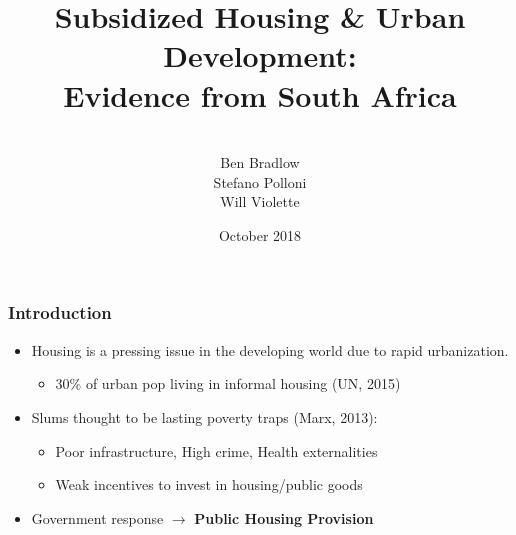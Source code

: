 \documentclass[aspectratio=32]{beamer}
\title{Subsidized Housing \& Urban Development: \\ Evidence from South Africa } %
\author{\\Ben Bradlow \\ Stefano Polloni\\ Will Violette}
\date{October 2018} %
\begin{document}
\beamertemplatenavigationsymbolsempty

\begin{frame}
\titlepage %
\end{frame}



\begin{frame}
\frametitle{Introduction}
\centering

\begin{itemize}
  \item<1-> Housing is a pressing issue in the developing world due to rapid urbanization. 
  \begin{itemize}
  \item 30\% of urban pop living in informal housing (UN, 2015)
  \end{itemize}
  \vspace{2mm}
  \item<2-> Slums thought to be lasting poverty traps (Marx, 2013): 
    \begin{itemize}
      \vspace{1mm}
      \item Poor infrastructure, High crime, Health externalities
      \vspace{1mm}
      \item Weak incentives to invest in housing/public goods
  \vspace{2mm}
    \end{itemize}
  \item<3->  Government response $\rightarrow$ \textbf{Public Housing Provision} 
\end{itemize}


\end{frame}
\end{document}
